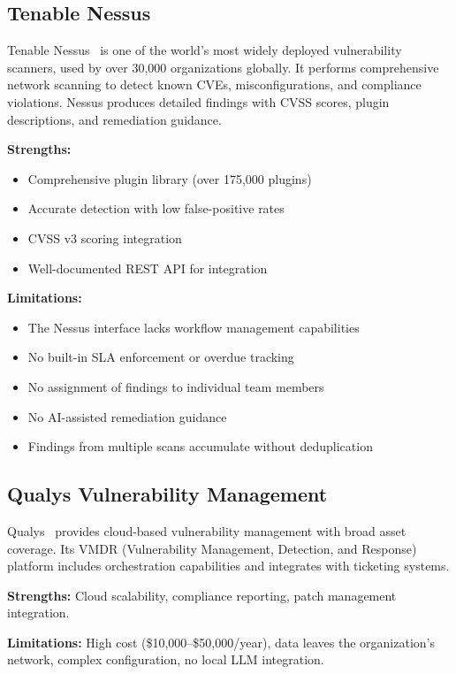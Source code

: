 \subsection{Tenable Nessus}

Tenable Nessus~\cite{tenable2024} is one of the world's most widely deployed vulnerability scanners, used by over 30,000 organizations globally. It performs comprehensive network scanning to detect known CVEs, misconfigurations, and compliance violations. Nessus produces detailed findings with CVSS scores, plugin descriptions, and remediation guidance.

\textbf{Strengths:}
\begin{itemize}
  \item Comprehensive plugin library (over 175,000 plugins)
  \item Accurate detection with low false-positive rates
  \item CVSS v3 scoring integration
  \item Well-documented REST API for integration
\end{itemize}

\textbf{Limitations:}
\begin{itemize}
  \item The Nessus interface lacks workflow management capabilities
  \item No built-in SLA enforcement or overdue tracking
  \item No assignment of findings to individual team members
  \item No AI-assisted remediation guidance
  \item Findings from multiple scans accumulate without deduplication
\end{itemize}

\subsection{Qualys Vulnerability Management}

Qualys~\cite{qualys2024} provides cloud-based vulnerability management with broad asset coverage. Its VMDR (Vulnerability Management, Detection, and Response) platform includes orchestration capabilities and integrates with ticketing systems.

\textbf{Strengths:} Cloud scalability, compliance reporting, patch management integration.

\textbf{Limitations:} High cost (\$10,000--\$50,000/year), data leaves the organization's network, complex configuration, no local LLM integration.

